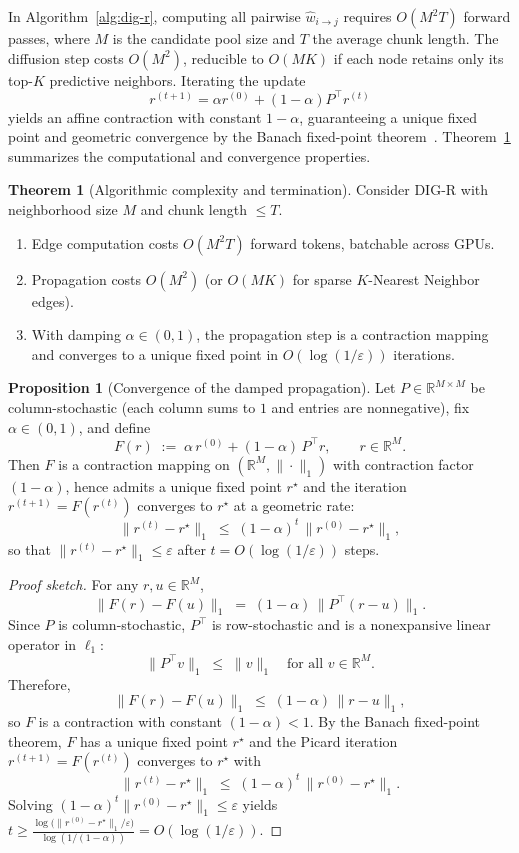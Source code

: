 \documentclass{article} %
\theoremstyle{definition}
\newtheorem{theorem}{Theorem}[section]
\newtheorem{proposition}{Proposition}[section]
\begin{document}
In Algorithm~\ref{alg:dig-r}, computing all pairwise $\hat{w}_{i\to j}$ requires $O(M^2 T)$ forward passes, where $M$ is the candidate pool size and $T$ the average chunk length. The diffusion step costs $O(M^2)$, reducible to $O(MK)$ if each node retains only its top-$K$ predictive neighbors. Iterating the update
\[
r^{(t+1)} = \alpha r^{(0)} + (1-\alpha) P^\top r^{(t)}
\]
yields an affine contraction with constant $1-\alpha$, guaranteeing a unique fixed point and geometric convergence by the Banach fixed-point theorem~\citep{page1999pagerank}. Theorem~\ref{thm:algo} summarizes the computational and convergence properties.

\begin{theorem}[Algorithmic complexity and termination]
\label{thm:algo}
Consider DIG-R with neighborhood size $M$ and chunk length $\le T$.
\begin{enumerate}
\item Edge computation costs $O(M^2 T)$ forward tokens, batchable across GPUs.
\item Propagation costs $O(M^2)$ (or $O(MK)$ for sparse $K$-Nearest Neighbor edges).
\item With damping $\alpha\in(0,1)$, the propagation step is a contraction mapping and converges to a unique fixed point in $O(\log(1/\varepsilon))$ iterations.
\end{enumerate}
\end{theorem}

\begin{proposition}[Convergence of the damped propagation]
Let $P \in \mathbb{R}^{M\times M}$ be column-stochastic (each column sums to $1$ and entries are nonnegative), fix $\alpha \in (0,1)$, and define
\[
F(r)\;:=\; \alpha\, r^{(0)} + (1-\alpha)\, P^\top r, 
\qquad r \in \mathbb{R}^M.
\]
Then $F$ is a contraction mapping on $(\mathbb{R}^M,\|\cdot\|_1)$ with contraction factor $(1-\alpha)$, hence admits a unique fixed point $r^\star$ and the iteration $r^{(t+1)}=F(r^{(t)})$ converges to $r^\star$ at a geometric rate:
\[
\|r^{(t)}-r^\star\|_1 \;\le\; (1-\alpha)^t \,\|r^{(0)}-r^\star\|_1,
\]
so that $\|r^{(t)}-r^\star\|_1 \le \varepsilon$ after $t = O(\log(1/\varepsilon))$ steps.
\end{proposition}

\begin{proof}[Proof sketch]
For any $r,u \in \mathbb{R}^M$,
\[
\|F(r)-F(u)\|_1 \;=\; (1-\alpha)\,\|P^\top(r-u)\|_1.
\]
Since $P$ is column-stochastic, $P^\top$ is row-stochastic and is a nonexpansive linear operator in $\ell_1$:
\[
\|P^\top v\|_1 \;\le\; \|v\|_1 \quad \text{for all } v\in\mathbb{R}^M.
\]
Therefore,
\[
\|F(r)-F(u)\|_1 \;\le\; (1-\alpha)\,\|r-u\|_1,
\]
so $F$ is a contraction with constant $(1-\alpha)<1$. By the Banach fixed-point theorem, $F$ has a unique fixed point $r^\star$ and the Picard iteration $r^{(t+1)}=F(r^{(t)})$ converges to $r^\star$ with
\[
\|r^{(t)}-r^\star\|_1 \;\le\; (1-\alpha)^t \,\|r^{(0)}-r^\star\|_1.
\]
Solving $(1-\alpha)^t \|r^{(0)}-r^\star\|_1 \le \varepsilon$ yields 
$t \ge \frac{\log\!\big(\|r^{(0)}-r^\star\|_1/\varepsilon\big)}{\log(1/(1-\alpha))} = O(\log(1/\varepsilon))$.
\end{proof}
\end{document}
